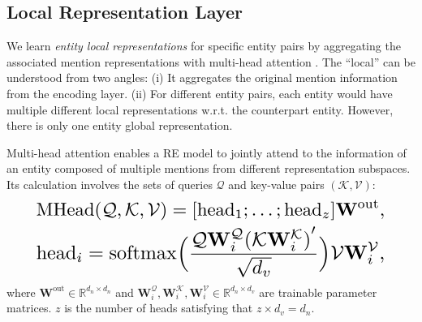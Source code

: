 \documentclass[11pt,a4paper]{article}
\begin{document}
\subsection{Local Representation Layer}

We learn \emph{entity local representations} for specific entity pairs by aggregating the associated mention representations with multi-head attention  \cite{vaswani2017attention}. The ``local'' can be understood from two angles: (i) It aggregates the original mention information from the encoding layer. (ii) For different entity pairs, each entity would have multiple different local representations w.r.t. the counterpart entity. However, there is only one entity global representation.

Multi-head attention enables a RE model to jointly attend to the information of an entity composed of multiple mentions from different representation subspaces. Its calculation involves the sets of queries $\mathcal{Q}$ and key-value pairs $(\mathcal{K},\mathcal{V})$:
\begin{align}
\resizebox{.89\columnwidth}{!}{$\begin{aligned}
\mathrm{MHead}(\mathcal{Q},\mathcal{K},\mathcal{V}) = [\textrm{head}_1;\ldots;\textrm{head}_z] \mathbf{W}^\textrm{out},
\end{aligned}$} \\
\resizebox{.89\columnwidth}{!}{$\begin{aligned}
\textrm{head}_i = \mathrm{softmax}\Big( \frac{\mathcal{Q} \mathbf{W}^\mathcal{Q}_i {(\mathcal{K} \mathbf{W}^\mathcal{K}_i)}^\prime} {\sqrt{d_v}} \Big) \mathcal{V} \mathbf{W}^\mathcal{V}_i,
\end{aligned}$}
\end{align}
where $\mathbf{W}^\textrm{out}\in\mathbb{R}^{d_n \times d_n}$ and $\mathbf{W}^\mathcal{Q}_i, \mathbf{W}^\mathcal{K}_i, \mathbf{W}^\mathcal{V}_i\in\mathbb{R}^{d_n\times d_v}$ are trainable parameter matrices. $z$ is the number of heads satisfying that $z\times d_v = d_n$.
\end{document}
